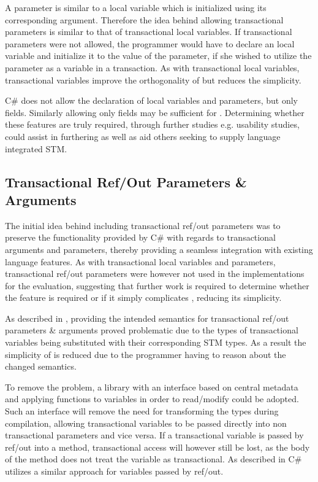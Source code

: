 A parameter is similar to a local variable which is initialized using its corresponding argument\cite[p. 76]{sestoft2011c}. Therefore the idea behind allowing transactional parameters is similar to that of transactional local variables. If transactional parameters were not allowed, the programmer would have to declare an  local variable and initialize it to the value of the parameter, if she wished to utilize the parameter as a variable in a transaction. As with transactional local variables, transactional variables improve the orthogonality of \stmname but reduces the simplicity.

C\# does not allow the declaration of  local variables and parameters, but only  fields. Similarly allowing only  fields may be sufficient for \stmname. Determining whether these features are truly required, through further studies e.g. usability studies, could assist in furthering \stmname as well as aid others seeking to supply language integrated \ac{STM}. 


\subsection{Transactional Ref/Out Parameters \& Arguments}\label{subse:reflection_ref_out}
The initial idea behind including transactional ref/out parameters was to preserve the functionality provided by C\# with regards to transactional arguments and parameters, thereby providing a seamless integration with existing language features. As with transactional local variables and parameters, transactional ref/out parameters were however not used in the implementations for the evaluation, suggesting that further work is required to determine whether the feature is required or if it simply complicates \stmname, reducing its simplicity. 

As described in , providing the intended semantics for transactional ref/out parameters \& arguments proved problematic due to the types of transactional variables being substituted with their corresponding \ac{STM} types. As a result the simplicity of \stmname is reduced due to the programmer having to reason about the changed semantics.

To remove the problem, a library with an interface based on central metadata and applying functions to variables in order to read/modify could be adopted. Such an interface will remove the need for transforming the types during compilation, allowing transactional variables to be passed directly into non transactional parameters and vice versa. If a transactional variable is passed by ref/out into a method, transactional access will however still be lost, as the body of the method does not treat the variable as transactional. As described in  C\# utilizes a similar approach for  variables passed by ref/out.

